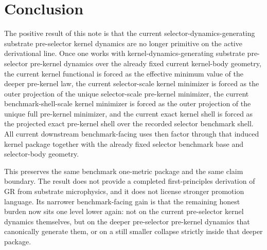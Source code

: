 \documentclass[11pt]{article}
\begin{document}
\section{Conclusion}

The positive result of this note is that the current selector-dynamics-generating substrate pre-selector kernel dynamics are no longer primitive on the active derivational line. Once one works with kernel-dynamics-generating substrate pre-selector pre-kernel dynamics over the already fixed current kernel-body geometry, the current kernel functional is forced as the effective minimum value of the deeper pre-kernel law, the current selector-scale kernel minimizer is forced as the outer projection of the unique selector-scale pre-kernel minimizer, the current benchmark-shell-scale kernel minimizer is forced as the outer projection of the unique full pre-kernel minimizer, and the current exact kernel shell is forced as the projected exact pre-kernel shell over the recorded selector benchmark shell. All current downstream benchmark-facing uses then factor through that induced kernel package together with the already fixed selector benchmark base and selector-body geometry.

This preserves the same benchmark one-metric package and the same claim boundary. The result does not provide a completed first-principles derivation of GR from substrate microphysics, and it does not license stronger promotion language. Its narrower benchmark-facing gain is that the remaining honest burden now sits one level lower again: not on the current pre-selector kernel dynamics themselves, but on the deeper pre-selector pre-kernel dynamics that canonically generate them, or on a still smaller collapse strictly inside that deeper package.
\end{document}
